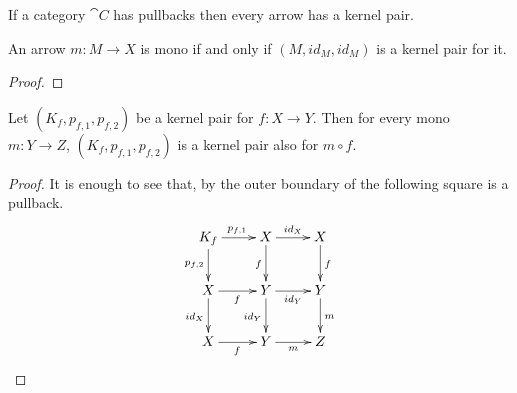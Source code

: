 \begin{remark}
	If a category $\cat{C}$ has pullbacks then every arrow has a kernel pair.
\end{remark}


\begin{prop}\label{prop:kermono}
	An arrow $m\colon M\to X$ is mono if and only if $(M, id_M, id_M)$ is a kernel pair for it.
\end{prop}
\begin{proof}
\end{proof}

\begin{cor}\label{cor:kermono}
	Let $(K_f, p_{f,1}, p_{f,2})$ be a kernel pair for $f\colon X\to Y$. Then for every mono $m\colon Y\to Z$, $(K_f, p_{f,1}, p_{f,2})$ is a kernel pair also for $m\circ f$.
\end{cor}
\begin{proof}
	It is enough to see that, by  the outer boundary of the following square is a pullback.
	\[\xymatrix{K_f\ar[r]^{p_{f,1}}  \ar[d]_{p_{f,2}}& X \ar[r]^{id_X} \ar[d]_{f}&X\ar[d]^{f} \\X \ar[d]_{id_X} \ar[r]_{f} & Y \ar[d]_{id_Y} \ar[r]_{id_Y}& Y \ar[d]^{m}\\X \ar[r]_{f} & Y \ar[r]_{m} & Z}\]
	
\end{proof}

